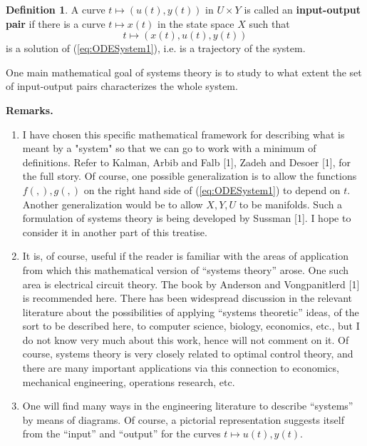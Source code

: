 \documentclass[12pt]{book}
\theoremstyle{plain}
\theoremstyle{definition}
\newtheorem{definition}{Definition}[section]
\begin{document}
\begin{definition}
A curve $t \mapsto (u(t), y(t))$ in $U \times Y$ is called an \textbf{input-output pair} if there is a curve $t \mapsto x(t)$ in the state space $X$ such that
$$t \mapsto (x(t), u(t), y(t))$$
is a solution of (\ref{eq:ODESystem1}), i.e. is a trajectory of the system.
\end{definition}

One main mathematical goal of systems theory is to study to what extent the set of input-output pairs characterizes the whole system.

\textbf{Remarks.} %
\begin{enumerate}
    \item I have chosen this specific mathematical framework for describing what is meant by a "system" so that we can go to work with a minimum of definitions.
    Refer to Kalman, Arbib and Falb [1], Zadeh and Desoer [1], for the full story. %
    Of course, one possible generalization is to allow the functions $f( , ), g( , )$ on the right hand side of (\ref{eq:ODESystem1}) to depend on $t$.
    Another generalization would be to allow $X, Y, U$ to be manifolds.
    Such a formulation of systems theory is being developed by Sussman [1]. %
    I hope to consider it in another part of this treatise.
    \item It is, of course, useful if the reader is familiar with the areas of application from which this mathematical version of ``systems theory'' arose.
    One such area is electrical circuit theory.
    The book by Anderson and Vongpanitlerd [1] is recommended here. %
    There has been widespread discussion in the relevant literature about the possibilities of applying ``systems theoretic'' ideas, of the sort to be described here, to computer science, biology, economics, etc., but I do not know very much about this work, hence will not comment on it.
    Of course, systems theory is very closely related to optimal control theory, and there are many important applications via this connection to economics, mechanical engineering, operations research, etc.
    \item One will find many ways in the engineering literature to describe ``systems'' by means of diagrams.
    Of course, a pictorial representation suggests itself from the ``input'' and ``output'' for the curves $t \mapsto u(t), y(t)$.

\end{enumerate}
\end{document}
